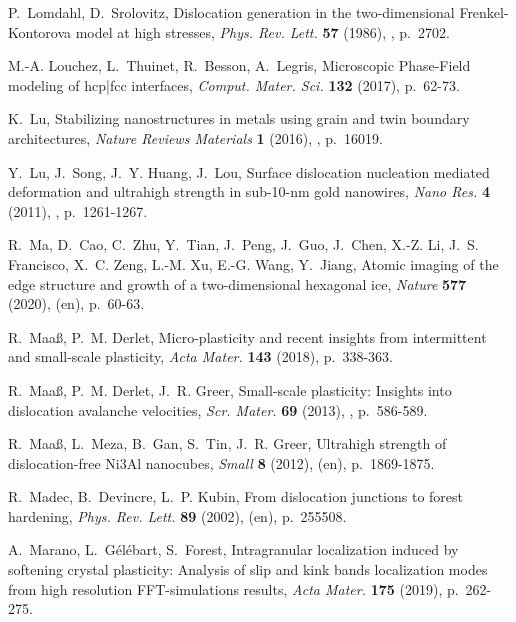 \documentclass[CRPHYS,Unicode,manuscript]{cedram}
\begin{document}
\begin{thebibliography}{100}
P.~Lomdahl, D.~Srolovitz, {\og Dislocation generation in the two-dimensional
  Frenkel-Kontorova model at high stresses\fg}, \emph{Phys. Rev. Lett.}
  \textbf{57} (1986), , p.~2702.

M.-A. Louchez, L.~Thuinet, R.~Besson, A.~Legris, {\og Microscopic {Phase-Field}
  modeling of hcp|fcc interfaces\fg}, \emph{Comput. Mater. Sci.} \textbf{132}
  (2017), p.~62-73.

K.~Lu, {\og Stabilizing nanostructures in metals using grain and twin boundary
  architectures\fg}, \emph{Nature Reviews Materials} \textbf{1} (2016),
  , p.~16019.

Y.~Lu, J.~Song, J.~Y. Huang, J.~Lou, {\og Surface dislocation nucleation
  mediated deformation and ultrahigh strength in sub-10-nm gold nanowires\fg},
  \emph{Nano Res.} \textbf{4} (2011), , p.~1261-1267.

R.~Ma, D.~Cao, C.~Zhu, Y.~Tian, J.~Peng, J.~Guo, J.~Chen, X.-Z. Li, J.~S.
  Francisco, X.~C. Zeng, L.-M. Xu, E.-G. Wang, Y.~Jiang, {\og Atomic imaging of
  the edge structure and growth of a two-dimensional hexagonal ice\fg},
  \emph{Nature} \textbf{577} (2020),  (en), p.~60-63.

R.~Maa{\ss}, P.~M. Derlet, {\og Micro-plasticity and recent insights from
  intermittent and small-scale plasticity\fg}, \emph{Acta Mater.} \textbf{143}
  (2018), p.~338-363.

R.~Maa{\ss}, P.~M. Derlet, J.~R. Greer, {\og Small-scale plasticity: Insights
  into dislocation avalanche velocities\fg}, \emph{Scr. Mater.} \textbf{69}
  (2013), , p.~586-589.

R.~Maa{\ss}, L.~Meza, B.~Gan, S.~Tin, J.~R. Greer, {\og Ultrahigh strength of
  dislocation-free {Ni3Al} nanocubes\fg}, \emph{Small} \textbf{8} (2012),
   (en), p.~1869-1875.

R.~Madec, B.~Devincre, L.~P. Kubin, {\og From dislocation junctions to forest
  hardening\fg}, \emph{Phys. Rev. Lett.} \textbf{89} (2002), 
  (en), p.~255508.

A.~Marano, L.~G{\'e}l{\'e}bart, S.~Forest, {\og Intragranular localization
  induced by softening crystal plasticity: Analysis of slip and kink bands
  localization modes from high resolution {FFT-simulations} results\fg},
  \emph{Acta Mater.} \textbf{175} (2019), p.~262-275.


\end{thebibliography}
\end{document}
